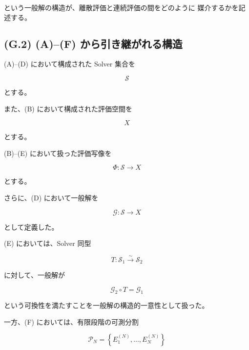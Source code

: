 \documentclass[a4paper,11pt]{article}
\begin{document}
という一般解の構造が、離散評価と連続評価の間をどのように
媒介するかを記述する。


\subsection{(G.2) (A)--(F) から引き継がれる構造}
\label{subsec:G2}

(A)--(D) において構成された Solver 集合を

\begin{equation}
    \mathcal{S}
\end{equation}

とする。

また、(B) において構成された評価空間を

\begin{equation}
    X
\end{equation}

とする。

(B)--(E) において扱った評価写像を

\begin{equation}
    \Phi:
    \mathcal{S}
    \longrightarrow
    X
\end{equation}

とする。

さらに、(D) において一般解を

\begin{equation}
    \mathcal{G}:
    \mathcal{S}
    \longrightarrow
    X
\end{equation}

として定義した。

(E) においては、Solver 同型

\begin{equation}
    T:
    \mathcal{S}_1
    \overset{\sim}{\longrightarrow}
    \mathcal{S}_2
\end{equation}

に対して、一般解が

\begin{equation}
    \mathcal{G}_2\circ T
    =
    \mathcal{G}_1
\end{equation}

という可換性を満たすことを一般解の構造的一意性として扱った。

一方、(F) においては、有限段階の可測分割

\begin{equation}
    \mathcal{P}_N
    =
    \left\{
        E_1^{(N)},
        \ldots,
        E_N^{(N)}
    \right\}
\end{equation}
\end{document}
